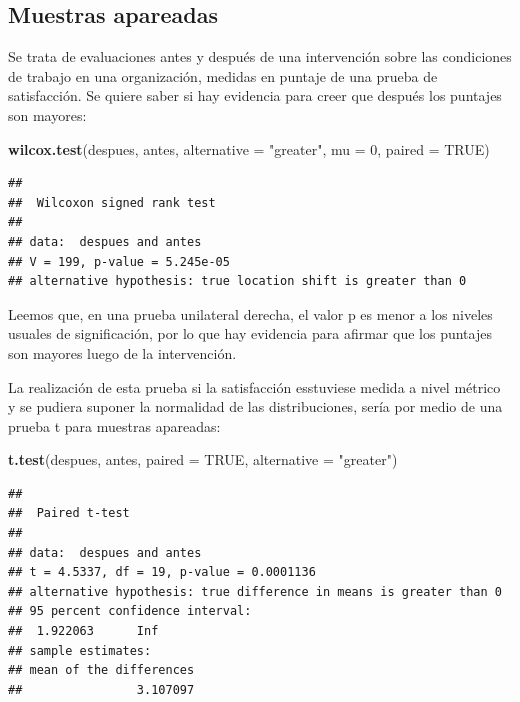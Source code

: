 \documentclass[]{book}
\newenvironment{Shaded}{\begin{snugshade}}{\end{snugshade}}
\newcommand{\DataTypeTok}[1]{\textcolor[rgb]{0.13,0.29,0.53}{#1}}
\newcommand{\DecValTok}[1]{\textcolor[rgb]{0.00,0.00,0.81}{#1}}
\newcommand{\KeywordTok}[1]{\textcolor[rgb]{0.13,0.29,0.53}{\textbf{#1}}}
\newcommand{\NormalTok}[1]{#1}
\newcommand{\OtherTok}[1]{\textcolor[rgb]{0.56,0.35,0.01}{#1}}
\newcommand{\StringTok}[1]{\textcolor[rgb]{0.31,0.60,0.02}{#1}}
\begin{document}
\hypertarget{muestras-apareadas-1}{%
\subsection{Muestras apareadas}\label{muestras-apareadas-1}}

Se trata de evaluaciones antes y después de una intervención sobre las condiciones de trabajo en una organización, medidas en puntaje de una prueba de satisfacción. Se quiere saber si hay evidencia para creer que después los puntajes son mayores:

\begin{Shaded}
\begin{Highlighting}[]
\KeywordTok{wilcox.test}\NormalTok{(despues, antes, }\DataTypeTok{alternative =} \StringTok{"greater"}\NormalTok{, }\DataTypeTok{mu =} \DecValTok{0}\NormalTok{, }\DataTypeTok{paired =} \OtherTok{TRUE}\NormalTok{)}
\end{Highlighting}
\end{Shaded}

\begin{verbatim}
## 
##  Wilcoxon signed rank test
## 
## data:  despues and antes
## V = 199, p-value = 5.245e-05
## alternative hypothesis: true location shift is greater than 0
\end{verbatim}

Leemos que, en una prueba unilateral derecha, el valor p es menor a los niveles usuales de significación, por lo que hay evidencia para afirmar que los puntajes son mayores luego de la intervención.

La realización de esta prueba si la satisfacción esstuviese medida a nivel métrico y se pudiera suponer la normalidad de las distribuciones, sería por medio de una prueba t para muestras apareadas:

\begin{Shaded}
\begin{Highlighting}[]
\KeywordTok{t.test}\NormalTok{(despues, antes, }\DataTypeTok{paired =} \OtherTok{TRUE}\NormalTok{, }\DataTypeTok{alternative =} \StringTok{"greater"}\NormalTok{)}
\end{Highlighting}
\end{Shaded}

\begin{verbatim}
## 
##  Paired t-test
## 
## data:  despues and antes
## t = 4.5337, df = 19, p-value = 0.0001136
## alternative hypothesis: true difference in means is greater than 0
## 95 percent confidence interval:
##  1.922063      Inf
## sample estimates:
## mean of the differences 
##                3.107097
\end{verbatim}
\end{document}
